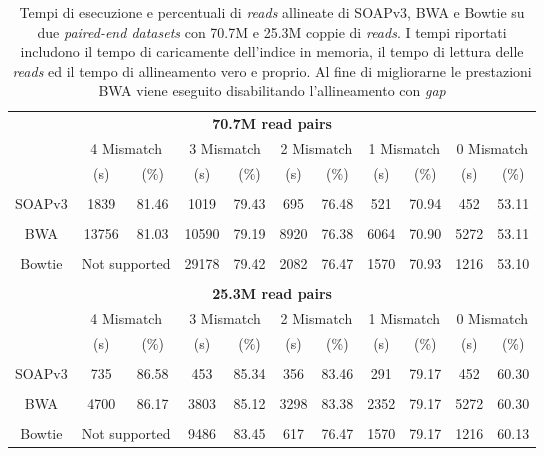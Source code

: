 \documentclass[conference]{IEEEtran}
\begin{document}
\begin{table}[ht]
\begin{center}
\begin{tabular}{c|cc|cc|cc|cc|cc}
\multicolumn{11}{c}{\textbf{70.7M read pairs}} \\
& \multicolumn{2}{c|}{4 Mismatch} & \multicolumn{2}{c|}{3 Mismatch} & \multicolumn{2}{c|}{2 Mismatch} & \multicolumn{2}{c|}{1 Mismatch} & \multicolumn{2}{c}{0 Mismatch}\\
& (s) & (\%) & (s) & (\%) & (s) & (\%) & (s) & (\%) & (s) & (\%) \\
&&&&&&&&&&\\
SOAPv3 & 1839 & 81.46 & 1019 & 79.43 & 695 & 76.48 & 521 & 70.94 & 452 & 53.11 \\
&&&&&&&&&&\\
BWA & 13756 & 81.03 & 10590 & 79.19 & 8920 & 76.38 & 6064 & 70.90 & 5272 & 53.11 \\
&&&&&&&&&&\\
Bowtie & \multicolumn{2}{c|}{Not supported} & 29178 & 79.42 & 2082 & 76.47 & 1570 & 70.93 & 1216 & 53.10 \\
&&&&&&&&&&\\
\multicolumn{11}{c}{\textbf{25.3M read pairs}} \\
& \multicolumn{2}{c|}{4 Mismatch} & \multicolumn{2}{c|}{3 Mismatch} & \multicolumn{2}{c|}{2 Mismatch} & \multicolumn{2}{c|}{1 Mismatch} & \multicolumn{2}{c}{0 Mismatch}\\
& (s) & (\%) & (s) & (\%) & (s) & (\%) & (s) & (\%) & (s) & (\%) \\
&&&&&&&&&&\\
SOAPv3 & 735 & 86.58 & 453 & 85.34 & 356 & 83.46 & 291 & 79.17 & 452 & 60.30 \\
&&&&&&&&&&\\
BWA & 4700 & 86.17 & 3803 & 85.12 & 3298 & 83.38 & 2352 & 79.17 & 5272 & 60.30 \\
&&&&&&&&&&\\
Bowtie & \multicolumn{2}{c|}{Not supported} & 9486 & 83.45 & 617 & 76.47 & 1570 & 79.17 & 1216 & 60.13 \\
\end{tabular}
\end{center}
\caption{Tempi di esecuzione e percentuali di \textit{reads} allineate di SOAPv3, BWA e Bowtie su due \textit{paired-end datasets} con 70.7M e 25.3M coppie di \textit{reads}. I tempi riportati includono il tempo di caricamente dell'indice in memoria, il tempo di lettura delle \textit{reads} ed il tempo di allineamento vero e proprio. Al fine di migliorarne le prestazioni BWA viene eseguito disabilitando l'allineamento con \textit{gap}}
\label{tab:SOAPv3}
\end{table}
\end{document}
